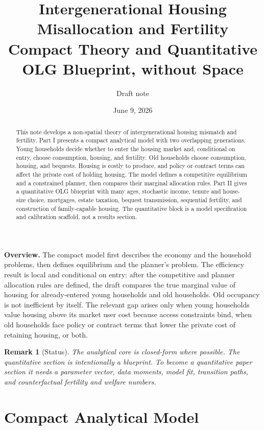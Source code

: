 \documentclass[11pt]{article}
\title{Intergenerational Housing Misallocation and Fertility\\[-0.15em]
\large Compact Theory and Quantitative OLG Blueprint, without Space}
\author{Draft note}
\date{June 9, 2026}
\newtheorem{remark}{Remark}
\newcommand{\1}{\mathbf 1}
\begin{document}
\maketitle

\begin{abstract}
This note develops a non-spatial theory of intergenerational housing mismatch and fertility. Part I presents a compact analytical model with two overlapping generations. Young households decide whether to enter the housing market and, conditional on entry, choose consumption, housing, and fertility. Old households choose consumption, housing, and bequests. Housing is costly to produce, and policy or contract terms can affect the private cost of holding housing. The model defines a competitive equilibrium and a constrained planner, then compares their marginal allocation rules. Part II gives a quantitative OLG blueprint with many ages, stochastic income, tenure and house-size choice, mortgages, estate taxation, bequest transmission, sequential fertility, and construction of family-capable housing. The quantitative block is a model specification and calibration scaffold, not a results section.
\end{abstract}

\textbf{Overview.} The compact model first describes the economy and the household problems, then defines equilibrium and the planner's problem. The efficiency result is local and conditional on entry: after the competitive and planner allocation rules are defined, the draft compares the true marginal value of housing for already-entered young households and old households. Old occupancy is not inefficient by itself. The relevant gap arises only when young households value housing above its market user cost because access constraints bind, when old households face policy or contract terms that lower the private cost of retaining housing, or both.

\begin{remark}[Status]
The analytical core is closed-form where possible. The quantitative section is intentionally a blueprint. To become a quantitative paper section it needs a parameter vector, data moments, model fit, transition paths, and counterfactual fertility and welfare numbers.
\end{remark}

\clearpage
\tableofcontents
\clearpage

\part{Compact Analytical Model}
\end{document}
